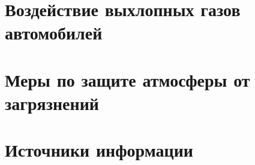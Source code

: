 \section{Воздействие выхлопных газов автомобилей}
\begin{frame}{\insertsectionhead}
\end{frame}

\section{Меры по защите атмосферы от загрязнений}
\begin{frame}{\insertsectionhead}
\end{frame}

\section{Источники информации}
\begin{frame}{\insertsectionhead}
\end{frame}
